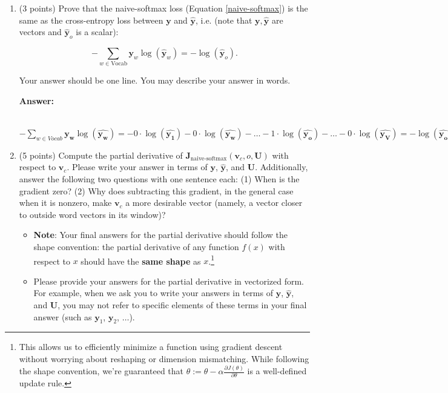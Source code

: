 \documentclass{article}
\newenvironment{answer}{
        {\bf Answer:} \sf \begingroup\color{red}
    }{\endgroup}%
\begin{document}
    \clearpage
    \begin{enumerate}
        [label=(\alph*)]
        \item (3 points)
        Prove that the naive-softmax loss (Equation \ref{naive-softmax}) is the same as the cross-entropy loss between $\bm y$ and $\hat{\bm y}$, i.e. (note that $\bm y, \hat{\bm y}$ are vectors and $\hat{\bm y}_o$ is a scalar):

        \begin{equation}
            -\sum_{w \in \text{Vocab}} \bm y_w \log(\hat{\bm y}_w) = - \log (\hat{\bm y}_o).
        \end{equation}

        Your answer should be one line. You may describe your answer in words.
        \begin{shaded}
            \begin{answer}
                \\
                $ - \sum_{w \in Vocab} \bm{y_w} \log(\hat{\bm{y_w}}) =
                - 0 \cdot \log(\hat{\bm{y_1}}) - 0 \cdot \log(\hat{\bm{y_w}}) - \dots
                - 1 \cdot \log(\hat{\bm{y_o}}) - \dots - 0 \cdot \log(\hat{\bm{y_V}}) =
                - \log(\hat{\bm{y_o}}) $
            \end{answer}
        \end{shaded}

        \item (5 points) Compute the partial derivative of $\bm J_{\text{naive-softmax}}(\bm v_c, o, \bm U)$ with respect to $\bm v_c$. Please write your answer in terms of $\bm y$, $\hat{\bm y}$, and $\bm U$. Additionally, answer the following two questions with one sentence each: (1) When is the gradient zero? (2) Why does subtracting this gradient, in the general case when it is nonzero, make $\bm v_c$ a more desirable vector (namely, a vector closer to outside word vectors in its window)?

        \begin{itemize}
            \item \textbf{Note}: Your final answers for the partial derivative should follow the shape convention: the partial derivative of any function $f(x)$ with respect to $x$ should have the \textbf{same shape} as $x$.\footnote{This allows us to efficiently minimize a function using gradient descent without worrying about reshaping or dimension mismatching. While following the shape convention, we're guaranteed that $\theta:= \theta - \alpha\frac{\partial J(\theta)}{\partial \theta}$ is a well-defined update rule.}
            \item Please provide your answers for the partial derivative in vectorized form. For example, when we ask you to write your answers in terms of $\bm y$, $\hat{\bm y}$, and $\bm U$, you may not refer to specific elements of these terms in your final answer (such as $\bm y_1$, $\bm y_2$, $\dots$).
        \end{itemize}




\end{enumerate}
\end{document}
